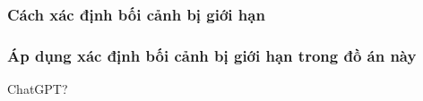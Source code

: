 









\subsubsection{Cách xác định bối cảnh bị giới hạn}








\subsubsection{Áp dụng xác định bối cảnh bị giới hạn trong đồ án này}

ChatGPT? 
